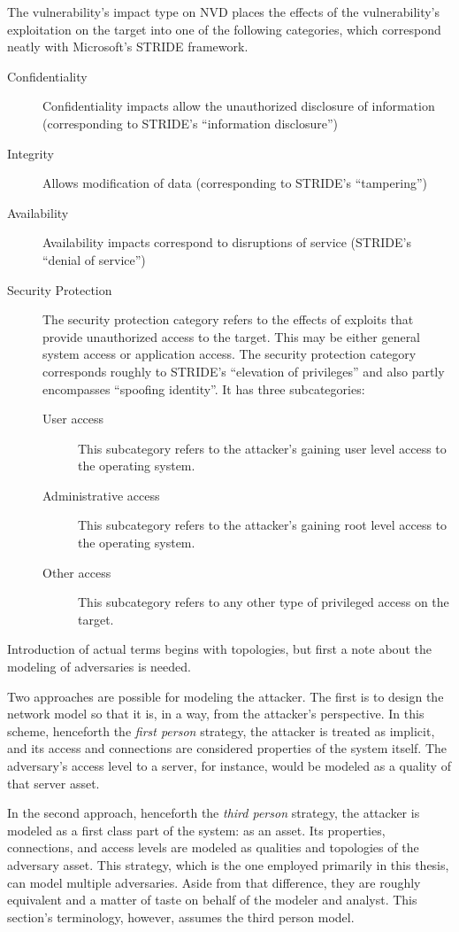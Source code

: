 The vulnerability's impact type on NVD places the effects of the vulnerability's
exploitation on the target into one of the following categories, which 
correspond neatly with Microsoft's STRIDE framework. %
\begin{description}
\item[Confidentiality] Confidentiality impacts allow the unauthorized disclosure 
    of information (corresponding to STRIDE's ``information disclosure'')
\item[Integrity] Allows modification of data (corresponding to STRIDE's ``tampering'')
\item[Availability] Availability impacts correspond to disruptions of service (STRIDE's
    ``denial of service'')
\item[Security Protection] The security protection category refers to the effects
    of exploits that provide unauthorized access to the target. This may be either
    general system access or application access. The security protection category
    corresponds roughly to STRIDE's ``elevation of privileges'' and also partly encompasses
    ``spoofing identity''. It has three subcategories:
    \begin{description}
    \item[User access] This subcategory refers to the attacker's gaining user level access
        to the operating system.
    \item[Administrative access] This subcategory refers to the attacker's gaining root level
        access to the operating system.
    \item[Other access] This subcategory refers to any other type of privileged access on
        the target.
    \end{description}
\end{description}
Introduction of actual terms begins with topologies, but first a note about the modeling
of adversaries is needed. 

Two approaches are possible for modeling the attacker. The first
is to design the network model so that it is, in a way, from the attacker's perspective.
In this scheme, henceforth the \emph{first person} strategy, the attacker is treated as
implicit, and its access and connections are considered properties of the system itself.
The adversary's access level to a server, for instance, would be modeled as a quality of
that server asset.

In the second approach, henceforth the \emph{third person} strategy, the attacker is
modeled as a first class part of the system: as an asset. Its properties, connections,
and access levels are modeled as qualities and topologies of the adversary asset.
This strategy, which is the one employed primarily in this thesis, can model multiple
adversaries. Aside from that difference, they are roughly equivalent and a matter
of taste on behalf of the modeler and analyst. This section's terminology, however,
assumes the third person model.

